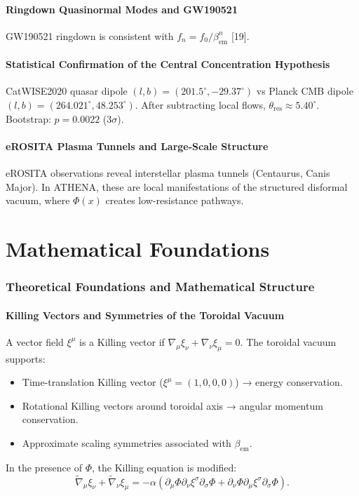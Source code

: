 \documentclass[12pt, a4paper]{article}
\begin{document}
\subsection{Ringdown Quasinormal Modes and GW190521}
GW190521 ringdown is consistent with $f_n = f_0 / \beta_{\mathrm{em}}^n$ [19].

\subsection{Statistical Confirmation of the Central Concentration Hypothesis}
CatWISE2020 quasar dipole $(l,b) = (201.5^\circ, -29.37^\circ)$ vs Planck CMB dipole $(l,b) = (264.021^\circ, 48.253^\circ)$. After subtracting local flows, $\theta_{\mathrm{res}} \approx 5.40^\circ$. Bootstrap: $p = 0.0022$ ($3\sigma$).

\subsection{eROSITA Plasma Tunnels and Large-Scale Structure}
\label{sec:erosita}
eROSITA observations reveal interstellar plasma tunnels (Centaurus, Canis Major). In ATHENA, these are local manifestations of the structured disformal vacuum, where $\Phi(x)$ creates low-resistance pathways.

\part{Mathematical Foundations}
\section{Theoretical Foundations and Mathematical Structure}
\label{sec:theory}

\subsection{Killing Vectors and Symmetries of the Toroidal Vacuum}
\label{sec:killing}
A vector field $\xi^\mu$ is a Killing vector if $\nabla_\mu \xi_\nu + \nabla_\nu \xi_\mu = 0$. The toroidal vacuum supports:
\begin{itemize}
    \item Time-translation Killing vector ($\xi^\mu = (1,0,0,0)$) → energy conservation.
    \item Rotational Killing vectors around toroidal axis → angular momentum conservation.
    \item Approximate scaling symmetries associated with $\beta_{\mathrm{em}}$.
\end{itemize}
In the presence of $\Phi$, the Killing equation is modified:
\begin{equation}
\tilde{\nabla}_\mu \xi_\nu + \tilde{\nabla}_\nu \xi_\mu = -\alpha \left( \partial_\mu\Phi \partial_\nu \xi^\sigma \partial_\sigma \Phi + \partial_\nu\Phi \partial_\mu \xi^\sigma \partial_\sigma \Phi \right).
\label{eq:modified_killing}
\end{equation}
\end{document}

